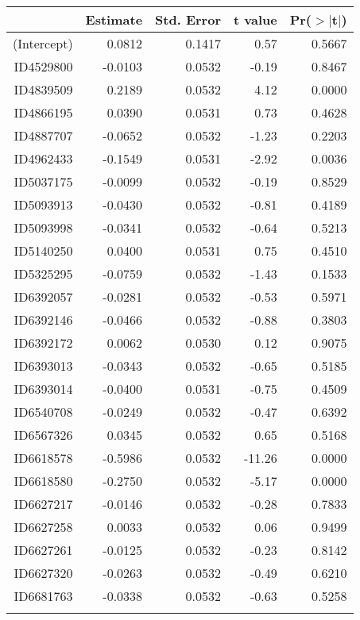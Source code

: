 \begin{table}[ht]
\centering
\begin{tabular}{rrrrr}
  \hline
 & Estimate & Std. Error & t value & Pr($>$$|$t$|$) \\ 
  \hline
(Intercept) & 0.0812 & 0.1417 & 0.57 & 0.5667 \\ 
  ID4529800 & -0.0103 & 0.0532 & -0.19 & 0.8467 \\ 
  ID4839509 & 0.2189 & 0.0532 & 4.12 & 0.0000 \\ 
  ID4866195 & 0.0390 & 0.0531 & 0.73 & 0.4628 \\ 
  ID4887707 & -0.0652 & 0.0532 & -1.23 & 0.2203 \\ 
  ID4962433 & -0.1549 & 0.0531 & -2.92 & 0.0036 \\ 
  ID5037175 & -0.0099 & 0.0532 & -0.19 & 0.8529 \\ 
  ID5093913 & -0.0430 & 0.0532 & -0.81 & 0.4189 \\ 
  ID5093998 & -0.0341 & 0.0532 & -0.64 & 0.5213 \\ 
  ID5140250 & 0.0400 & 0.0531 & 0.75 & 0.4510 \\ 
  ID5325295 & -0.0759 & 0.0532 & -1.43 & 0.1533 \\ 
  ID6392057 & -0.0281 & 0.0532 & -0.53 & 0.5971 \\ 
  ID6392146 & -0.0466 & 0.0532 & -0.88 & 0.3803 \\ 
  ID6392172 & 0.0062 & 0.0530 & 0.12 & 0.9075 \\ 
  ID6393013 & -0.0343 & 0.0532 & -0.65 & 0.5185 \\ 
  ID6393014 & -0.0400 & 0.0531 & -0.75 & 0.4509 \\ 
  ID6540708 & -0.0249 & 0.0532 & -0.47 & 0.6392 \\ 
  ID6567326 & 0.0345 & 0.0532 & 0.65 & 0.5168 \\ 
  ID6618578 & -0.5986 & 0.0532 & -11.26 & 0.0000 \\ 
  ID6618580 & -0.2750 & 0.0532 & -5.17 & 0.0000 \\ 
  ID6627217 & -0.0146 & 0.0532 & -0.28 & 0.7833 \\ 
  ID6627258 & 0.0033 & 0.0532 & 0.06 & 0.9499 \\ 
  ID6627261 & -0.0125 & 0.0532 & -0.23 & 0.8142 \\ 
  ID6627320 & -0.0263 & 0.0532 & -0.49 & 0.6210 \\ 
  ID6681763 & -0.0338 & 0.0532 & -0.63 & 0.5258 \\ 
$$
\end{tabular}
\end{table}
